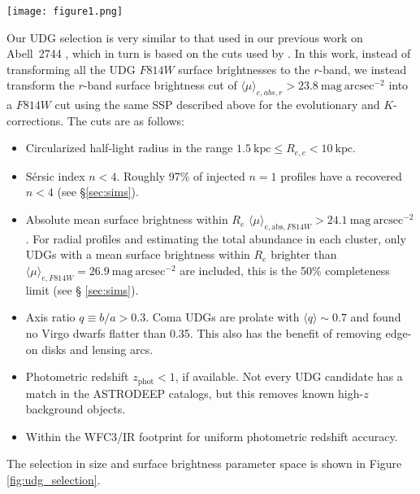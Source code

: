 \documentclass[iop,tighten,twocolumn,apj,floatfix]{emulateapj}
\begin{document}
\begin{figure*}
	\texttt{[image: figure1.png]}
	\caption{
    UDG selection by size and absolute mean surface brightness within $R_e$.
    Effective radii and absolute surface brightnesses are computed assuming
    all detected sources reside at the cluster redshift. The UDGs, shown in
    red, are selected with $\langle\mu\rangle_{e,\mathrm{abs},F814W} > 24.1 ~
    \mathrm{mag}~\mathrm{arcsec}^{-2}$ and circularized effective radii in the
    range $1.5~\mathrm{kpc} \leq R_{e,c} < 10~\mathrm{kpc}$ (blue dashed lines). The additional
    cuts, including a visual inspection,
    are described in the text. The dashed vertical grey line corresponds to
    the 50\% mean surface brightness completeness limit of
    $26.9~\mathrm{mag}~\mathrm{arcsec}^{-2}$, transformed to the redshift of
    each cluster.
    \label{fig:udg_selection}
	}
\end{figure*}

Our UDG selection is very similar to that used in our previous work on
Abell~2744 \citep{janssens2017}, which in turn is based on the cuts used by
\cite{vdb2016}.
In this work, instead of transforming all the UDG $F814W$ surface brightnesses
to the $r$-band, we instead transform the $r$-band surface brightness cut of
$\langle\mu\rangle_{e,abs,r} > 23.8~\mathrm{mag}~\mathrm{arcsec}^{-2}$ into
a $F814W$ cut using the same SSP described above for the evolutionary and
$K$-corrections.
The cuts are as follows:
\begin{itemize}
\item Circularized half-light radius in the range $1.5~\mathrm{kpc} \leq R_{e,c} <
    10~\mathrm{kpc}$.
\item S\'{e}rsic index $n < 4$. Roughly 97\% of injected $n=1$ profiles have a
    recovered $n < 4$ (see \S \ref{sec:sims}).
\item Absolute mean surface brightness within $R_e$
    $\langle\mu\rangle_{e,\mathrm{abs},F814W} >
        24.1~\mathrm{mag}~\mathrm{arcsec}^{-2}$. For radial profiles and
        estimating the total abundance in each cluster, only UDGs with a mean
        surface brightness within $R_e$ brighter than
        $\langle\mu\rangle_{e,F814W} = 26.9~\mathrm{mag}~\mathrm{arcsec}^{-2}$
        are included, this is the 50\% completeness limit (see \S
        \ref{sec:sims}).
\item Axis ratio $q \equiv b/a > 0.3$. Coma UDGs are prolate with $\langle q
    \rangle \sim 0.7$ \citep{burkert2017} and \cite{chen2010} found no Virgo
        dwarfs flatter than 0.35. This also has the benefit of removing
        edge-on disks and lensing arcs.
\item Photometric redshift $z_{\mathrm{phot}} < 1$, if available. Not every
    UDG candidate has a match in the ASTRODEEP catalogs, but this removes
    known high-$z$ background objects.
\item Within the WFC3/IR footprint for uniform photometric redshift accuracy.
\end{itemize}
The selection in size and surface brightness parameter space is shown in Figure
\ref{fig:udg_selection}.
\end{document}
